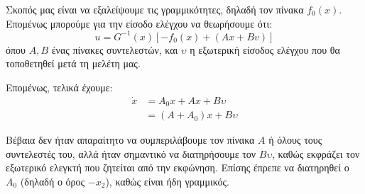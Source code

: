 \documentclass[11pt,a4paper,notitlepage,fleqn]{article}
\begin{document}
\begin{exercise}
	Σκοπός μας είναι να εξαλείψουμε τις γραμμικότητες, δηλαδή τον πίνακα
	\( f_0(x) \). Επομένως μπορούμε για την είσοδο ελέγχου να θεωρήσουμε
	ότι:
	\[
	u = G^{-1}(x)\left[
	-f_0(x) + (Ax+Bv)
	\right]
	\]
	όπου \( A,B \) ένας πίνακες συντελεστών, και \( \upsilon \) η
	εξωτερική είσοδος ελέγχου που θα τοποθετηθεί μετά τη μελέτη μας.
	
	Επομένως, τελικά έχουμε:
	\begin{align*}
		\dot x &= A_0 x + Ax + Bυ\\
		&= (A+A_0)x + Bυ
	\end{align*}
	
	Βέβαια δεν ήταν απαραίτητο να συμπεριλάβουμε τον πίνακα \( Α \) ή
	όλους τους συντελεστές του, αλλά ήταν σημαντικό να διατηρήσουμε
	τον \( Bυ \), καθώς εκφράζει τον εξωτερικό ελεγκτή που ζητείται από
	την εκφώνηση. Επίσης έπρεπε να διατηρηθεί ο \( A_0 \) (δηλαδή ο
	όρος \( -x_2 \)), καθώς είναι ήδη γραμμικός.
\end{exercise}
\end{document}
